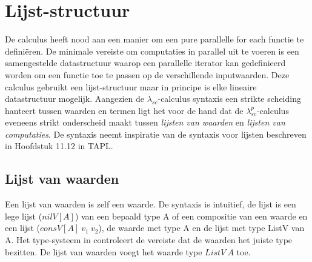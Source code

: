 \section{Lijst-structuur}
De calculus heeft nood aan een manier om een pure parallelle for each functie te definiëren. De minimale vereiste om computaties in parallel uit te voeren is een samengestelde datastructuur waarop een parallelle iterator kan gedefinieerd worden om een functie toe te passen op de verschillende inputwaarden.
Deze calculus gebruikt een lijst-structuur maar in principe is elke lineaire datastructuur mogelijk. \newline
Aangezien de $\lambda_{sc}$-calculus syntaxis een strikte scheiding hanteert tussen waarden en termen ligt het voor de hand dat de $\lambda_{sc}^{p}$-calculus eveneens strikt onderscheid maakt tussen \emph{lijsten van waarden} en \emph{lijsten van computaties}. \newline
De syntaxis neemt inspiratie van de syntaxis voor lijsten beschreven in Hoofdstuk 11.12 in TAPL\cite{Pierce2002}.

\subsection{Lijst van waarden}
Een lijst van waarden is zelf een waarde. De syntaxis is intuïtief, de lijst is een lege lijst ($nilV[A]$) van een bepaald type A of een compositie van een waarde en een lijst ($consV[A] \  v_1 \ 
 v_2$), de waarde met type A en de lijst met type ListV van A. Het type-systeem in  controleert de vereiste dat de waarden het juiste type bezitten. De lijst van waarden voegt het waarde type $ListV \ A$ toe.

